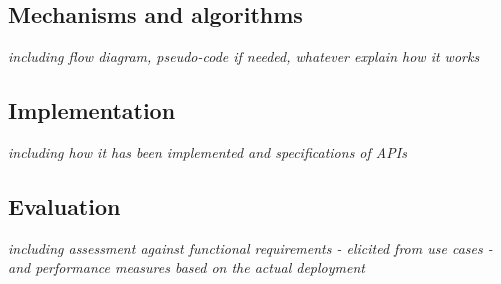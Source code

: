 \subsection{Mechanisms and algorithms}
{\it including flow diagram, pseudo-code if needed, whatever explain
  how it works}
\subsection{Implementation}
{\it including how it has been implemented and specifications of APIs}
\subsection{Evaluation}
{\it including assessment against functional requirements - elicited
  from use cases - and performance measures based on the actual
  deployment}